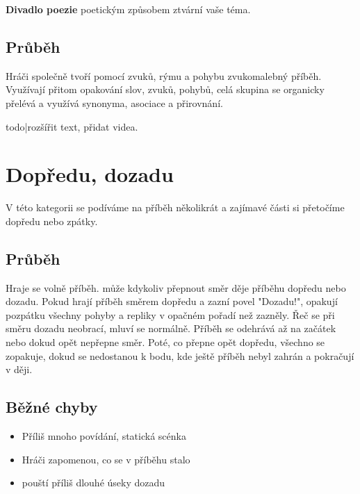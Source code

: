 \documentclass[main.tex]{subfiles}
\begin{document}
 
\textbf{Divadlo poezie}{} poetickým způsobem ztvární vaše téma. 
 
 
\subsection{Průběh} Hráči společně tvoří pomocí zvuků, rýmu a pohybu zvukomalebný příběh. 
Využívají přitom opakování slov, zvuků, pohybů, celá skupina se organicky přelévá a využívá synonyma, asociace a přirovnání. 
 
{{todo|rozšířit text, přidat videa.}} 
 
 
 
 
 
\needspace{5cm} \section{Dopředu, dozadu} \label{dopředu, dozadu}  
 
V této kategorii se podíváme na příběh několikrát a zajímavé části si přetočíme dopředu nebo zpátky. 
 
\subsection{ Průběh } Hraje se volně příběh.  může kdykoliv přepnout směr děje příběhu dopředu nebo dozadu. Pokud  hrají příběh směrem dopředu a zazní povel "Dozadu!", opakují pozpátku všechny pohyby a repliky v opačném pořadí než zazněly. Řeč se při směru dozadu neobrací, mluví se normálně. Příběh se odehrává až na začátek nebo dokud  opět nepřepne směr. Poté, co  přepne opět dopředu, všechno se zopakuje, dokud se  nedostanou k bodu, kde ještě příběh nebyl zahrán a pokračují v ději. 
 
\subsection{ Běžné chyby } \begin{itemize}
\item  Příliš mnoho povídání, statická scénka
\item  Hráči zapomenou, co se v příběhu stalo
\item  {} pouští příliš dlouhé úseky dozadu
\end{itemize}
 
 
 
 
 
\end{document}
